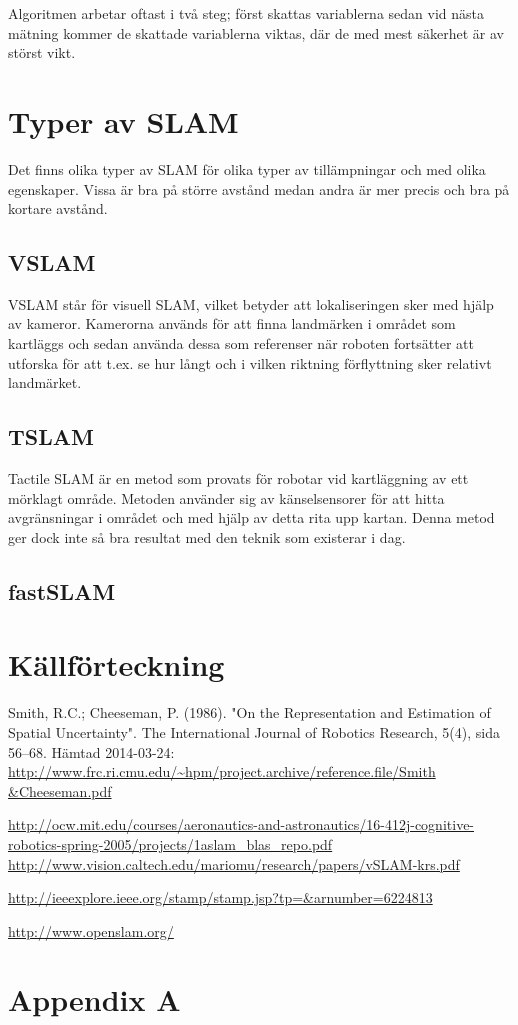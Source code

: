 \documentclass[a4paper,12pt,fleqn]{article}
\begin{document}
Algoritmen arbetar oftast i två steg; först skattas variablerna sedan vid nästa mätning 
kommer de skattade variablerna viktas, där de med mest säkerhet är av störst vikt.

\section{Typer av SLAM}

Det finns olika typer av SLAM för olika typer av tillämpningar och med olika egenskaper. Vissa är bra på större avstånd medan andra är mer precis och bra på kortare avstånd. 

\subsection{VSLAM}

VSLAM står för visuell SLAM, vilket betyder att lokaliseringen sker med hjälp av kameror. Kamerorna används för att finna landmärken i området som kartläggs och sedan använda dessa som referenser när roboten fortsätter att utforska för att t.ex. se hur långt och i vilken riktning förflyttning sker relativt landmärket.

\subsection{TSLAM}
Tactile SLAM är en metod som provats för robotar vid kartläggning av ett mörklagt område. Metoden använder sig av känselsensorer för att hitta avgränsningar i området och med hjälp av detta rita upp kartan. Denna metod ger dock inte så bra resultat med den teknik som existerar i dag.

\subsection{fastSLAM}


\newpage \section{Källförteckning} Smith, R.C.; Cheeseman, P. (1986).
"On the Representation and Estimation of Spatial Uncertainty". The
International Journal of Robotics Research, 5(4), sida 56–68. Hämtad
2014-03-24:
\url{http://www.frc.ri.cmu.edu/~hpm/project.archive/reference.file/Smith
&Cheeseman.pdf}

\url{http://ocw.mit.edu/courses/aeronautics-and-astronautics/16-412j-cognitive-robotics-spring-2005/projects/1aslam_blas_repo.pdf}
\url{http://www.vision.caltech.edu/mariomu/research/papers/vSLAM-krs.pdf}

\url{http://ieeexplore.ieee.org/stamp/stamp.jsp?tp=&arnumber=6224813}

\url{http://www.openslam.org/}

% 
\newpage \appendix \pagestyle{empty}
 \section{Appendix A}
\end{document}
